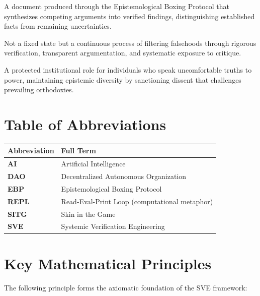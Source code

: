 \documentclass[11pt,a4paper]{article}
\begin{document}
\begin{description}[style=nextline, leftmargin=0pt, labelindent=0pt, font=\normalfont\bfseries]
    \item[Synthetic Report] A document produced through the Epistemological Boxing Protocol that synthesizes competing arguments into verified findings, distinguishing established facts from remaining uncertainties.
    
    \item[Truth (Operational Definition)] Not a fixed state but a continuous process of filtering falsehoods through rigorous verification, transparent argumentation, and systematic exposure to critique.
    
    \item[Yurodivy (Holy Fool)] A protected institutional role for individuals who speak uncomfortable truths to power, maintaining epistemic diversity by sanctioning dissent that challenges prevailing orthodoxies.
\end{description}

\section*{Table of Abbreviations}

\begin{tabular}{@{}>{\bfseries}ll@{}}
\toprule
\normalfont\textbf{Abbreviation} & \textbf{Full Term} \\
\midrule
AI & Artificial Intelligence \\
DAO & Decentralized Autonomous Organization \\
EBP & Epistemological Boxing Protocol \\
REPL & Read-Eval-Print Loop (computational metaphor) \\
SITG & Skin in the Game \\
SVE & Systemic Verification Engineering \\
\bottomrule
\end{tabular}

\vspace{1cm}

\section*{Key Mathematical Principles}

\noindent The following principle forms the axiomatic foundation of the SVE framework:
\end{document}
